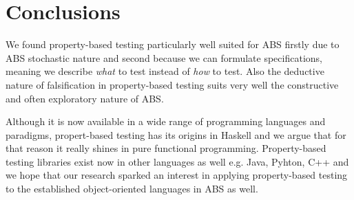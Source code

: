 \section{Conclusions}
\label{sec:conclusions}

We found property-based testing particularly well suited for ABS firstly due to ABS stochastic nature and second because we can formulate specifications, meaning we describe \textit{what} to test instead of \textit{how} to test. Also the deductive nature of falsification in property-based testing suits very well the constructive and often exploratory nature of ABS. 

Although it is now available in a wide range of programming languages and paradigms, propert-based testing has its origins in Haskell \cite{claessen_quickcheck_2000,claessen_testing_2002} and we argue that for that reason it really shines in pure functional programming. Property-based testing libraries exist now in other languages as well e.g. Java, Pyhton, C++ and we hope that our research sparked an interest in applying property-based testing to the established object-oriented languages in ABS as well.

%
